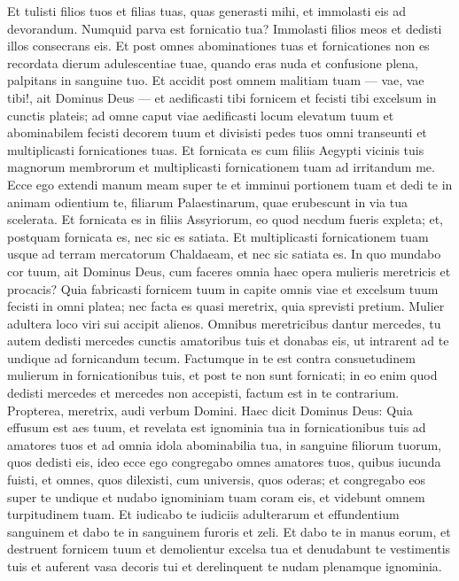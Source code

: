 \begin{biblechapter}
\begin{biblechapter}
\begin{biblechapter}
\begin{biblechapter}
\begin{biblechapter}
\begin{biblechapter}
\begin{biblechapter}
\begin{biblechapter}
\begin{biblechapter}
\begin{biblechapter}
\begin{biblechapter}
\begin{biblechapter}
\begin{biblechapter}
\begin{biblechapter}
\begin{biblechapter}
\begin{biblechapter}
 \verse Et tulisti filios tuos et filias tuas, quas generasti mihi, et immolasti eis ad devorandum. Numquid parva est fornicatio tua? 
\verse Immolasti filios meos et dedisti illos consecrans eis. 
\verse Et post omnes abominationes tuas et fornicationes non es recordata dierum adulescentiae tuae, quando eras nuda et confusione plena, palpitans in sanguine tuo.
 \verse Et accidit post omnem malitiam tuam — vae, vae tibi!, ait Dominus Deus — 
\verse et aedificasti tibi fornicem et fecisti tibi excelsum in cunctis plateis; 
 \verse ad omne caput viae aedificasti locum elevatum tuum et abominabilem fecisti decorem tuum et divisisti pedes tuos omni transeunti et multiplicasti fornicationes tuas. 
\verse Et fornicata es cum filiis Aegypti vicinis tuis magnorum membrorum et multiplicasti fornicationem tuam ad irritandum me. 
\verse Ecce ego extendi manum meam super te et imminui portionem tuam et dedi te in animam odientium te, filiarum Palaestinarum, quae erubescunt in via tua scelerata.
 \verse Et fornicata es in filiis Assyriorum, eo quod necdum fueris expleta; et, postquam fornicata es, nec sic es satiata. 
\verse Et multiplicasti fornicationem tuam usque ad terram mercatorum Chaldaeam, et nec sic satiata es. 
\verse In quo mundabo cor tuum, ait Dominus Deus, cum faceres omnia haec opera mulieris meretricis et procacis? 
\verse Quia fabricasti fornicem tuum in capite omnis viae et excelsum tuum fecisti in omni platea; nec facta es quasi meretrix, quia sprevisti pretium. 
\verse Mulier adultera loco viri sui accipit alienos. 
\verse Omnibus meretricibus dantur mercedes, tu autem dedisti mercedes cunctis amatoribus tuis et donabas eis, ut intrarent ad te undique ad fornicandum tecum. 
 \verse Factumque in te est contra consuetudinem mulierum in fornicationibus tuis, et post te non sunt fornicati; in eo enim quod dedisti mercedes et mercedes non accepisti, factum est in te contrarium.
 \verse Propterea, meretrix, audi verbum Domini. 
\verse Haec dicit Dominus Deus: Quia effusum est aes tuum, et revelata est ignominia tua in fornicationibus tuis ad amatores tuos et ad omnia idola abominabilia tua, in sanguine filiorum tuorum, quos dedisti eis, 
\verse ideo ecce ego congregabo omnes amatores tuos, quibus iucunda fuisti, et omnes, quos dilexisti, cum universis, quos oderas; et congregabo eos super te undique et nudabo ignominiam tuam coram eis, et videbunt omnem turpitudinem tuam. 
\verse Et iudicabo te iudiciis adulterarum et effundentium sanguinem et dabo te in sanguinem furoris et zeli. 
\verse Et dabo te in manus eorum, et destruent fornicem tuum et demolientur excelsa tua et denudabunt te vestimentis tuis et auferent vasa decoris tui et derelinquent te nudam plenamque ignominia. 

\end{biblechapter}
\end{biblechapter}
\end{biblechapter}
\end{biblechapter}
\end{biblechapter}
\end{biblechapter}
\end{biblechapter}
\end{biblechapter}
\end{biblechapter}
\end{biblechapter}
\end{biblechapter}
\end{biblechapter}
\end{biblechapter}
\end{biblechapter}
\end{biblechapter}
\end{biblechapter}

